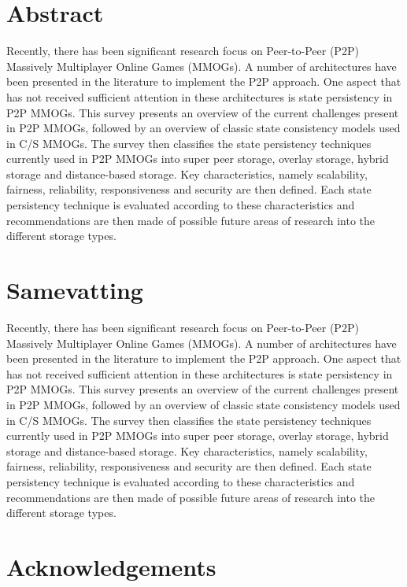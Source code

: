 
\chapter*{Abstract}
Recently, there has been significant research focus on Peer-to-Peer (P2P) Massively Multiplayer Online Games (MMOGs). A number of architectures have
been presented in the literature to implement the P2P approach. One aspect that has not received sufficient attention in these architectures is state
persistency in P2P MMOGs. This survey presents an overview of the current challenges present in P2P MMOGs, followed by an overview of classic state
consistency models used in C/S MMOGs. The survey then classifies the state persistency techniques currently used in P2P MMOGs into super peer
storage, overlay storage, hybrid storage and distance-based storage. Key characteristics, namely scalability, fairness, reliability, responsiveness
and security are then defined. Each state persistency technique is evaluated according to these characteristics and recommendations are then made of
possible future areas of research into the different storage types.


\chapter*{Samevatting}

Recently, there has been significant research focus on Peer-to-Peer (P2P) Massively Multiplayer Online Games (MMOGs). A number of architectures have
been presented in the literature to implement the P2P approach. One aspect that has not received sufficient attention in these architectures is state
persistency in P2P MMOGs. This survey presents an overview of the current challenges present in P2P MMOGs, followed by an overview of classic state
consistency models used in C/S MMOGs. The survey then classifies the state persistency techniques currently used in P2P MMOGs into super peer
storage, overlay storage, hybrid storage and distance-based storage. Key characteristics, namely scalability, fairness, reliability, responsiveness
and security are then defined. Each state persistency technique is evaluated according to these characteristics and recommendations are then made of
possible future areas of research into the different storage types.


\chapter{Acknowledgements}%

